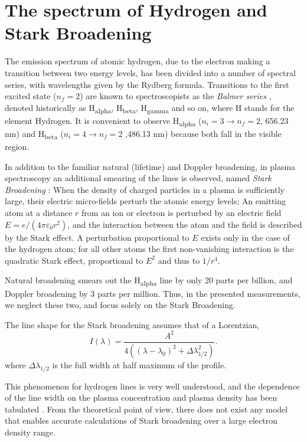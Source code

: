 \documentclass[nofonts]{tufte-book}
\begin{document}
\section{The spectrum of Hydrogen and Stark Broadening}\label{sec:hydrogen}
The emission spectrum of atomic hydrogen, due to the electron making a transition between two energy levels, has been divided into a number of spectral series, with wavelengths given by the Rydberg formula. Transitions to the first excited state ($n_f=2$) are known to spectroscopists as the \textit{Balmer series} , denoted historically as H\textsubscript{alpha}, H\textsubscript{beta}, H\textsubscript{gamma} and so on, where H stands for the element Hydrogen. It is convenient to observe H\textsubscript{alpha} ($n_i=3 \to n_f=2$, 656.23 nm) and H\textsubscript{beta} ($n_i=4 \to n_f=2$ ,486.13 nm) because both fall in the visible region.

In addition to the familiar natural (lifetime) and Doppler broadening, in plasma spectroscopy an additional smearing of the lines is observed, named \textit{Stark Broadening} : When the density of charged particles in a plasma is sufficiently large, their electric micro-fields perturb the atomic energy levels\cite{Griem1974}; An emitting atom at a distance $r$ from an ion or electron is perturbed by an electric field $E=e/(4\pi \varepsilon_0 r^2)$, and the interaction between the atom and the field is described by the Stark effect. A perturbation proportional to $E$ exists only in the case of the hydrogen atom; for all other atoms the first non-vanishing interaction is the quadratic Stark effect, proportional to $E^2$ and thus to $1/r^4$\cite{Thorne1988}.

Natural broadening smears out the H\textsubscript{alpha} line by only 20 parts per billion, and Doppler broadening by 3 parts per million. Thus, in the presented measurements, we neglect these two, and focus solely on the Stark Broadening.

The line shape for the Stark broadening assumes that of a Lorentzian,
\begin{equation}
I\left( \lambda \right)=\frac{A^2}{4\left( \left(\lambda-\lambda_0\right)^2+\Delta \lambda_{1/2}^2\right)}. \label{eq:Stark_Broadening}
\end{equation}
where $\Delta \lambda_{1/2}$ is the full width at half maximum of the profile.

This phenomenon for hydrogen lines is very well understood, and the dependence of the line width on the plasma concentration and plasma density has been tabulated \cite{Griem1964,Griem1974}. From the theoretical point of view, there does not exist any model that enables accurate calculations of Stark broadening over a large electron density range\cite{Griem2000}. 
\end{document}
